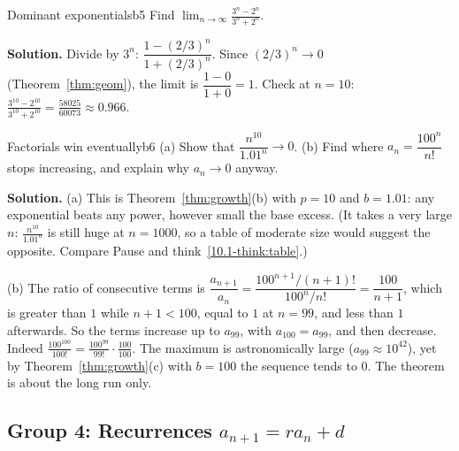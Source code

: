 \documentclass[11pt]{article}
\begin{document}
\begin{exmp}{Dominant exponentials}{b5}
Find $\displaystyle\lim_{n\to\infty}\frac{3^n-2^n}{3^n+2^n}$.

\textbf{Solution.} Divide by $3^n$: $\dfrac{1-(2/3)^n}{1+(2/3)^n}$. Since $(2/3)^n\to0$ (Theorem~\ref{thm:geom}), the limit is $\dfrac{1-0}{1+0}=1$. Check at $n=10$: $\frac{3^{10}-2^{10}}{3^{10}+2^{10}}=\frac{58025}{60073}\approx0.966$.
\end{exmp}

\begin{exmp}{Factorials win eventually}{b6}
(a) Show that $\dfrac{n^{10}}{1.01^n}\to0$. (b) Find where $a_n=\dfrac{100^n}{n!}$ stops increasing, and explain why $a_n\to0$ anyway.

\textbf{Solution.} (a) This is Theorem~\ref{thm:growth}(b) with $p=10$ and $b=1.01$: any exponential beats any power, however small the base excess. (It takes a very large $n$: $\frac{n^{10}}{1.01^n}$ is still huge at $n=1000$, so a table of moderate size would suggest the opposite. Compare Pause and think~\ref{10.1-think:table}.)

(b) The ratio of consecutive terms is $\dfrac{a_{n+1}}{a_n}=\dfrac{100^{n+1}/(n+1)!}{100^n/n!}=\dfrac{100}{n+1}$, which is greater than $1$ while $n+1<100$, equal to $1$ at $n=99$, and less than $1$ afterwards. So the terms increase up to $a_{99}$, with $a_{100}=a_{99}$, and then decrease. Indeed $\frac{100^{100}}{100!}=\frac{100^{99}}{99!}\cdot\frac{100}{100}$.
The maximum is astronomically large ($a_{99}\approx10^{42}$), yet by Theorem~\ref{thm:growth}(c) with $b=100$ the sequence tends to $0$. The theorem is about the long run only.
\end{exmp}

\subsection*{Group 4: Recurrences $a_{n+1}=ra_n+d$}
\end{document}
